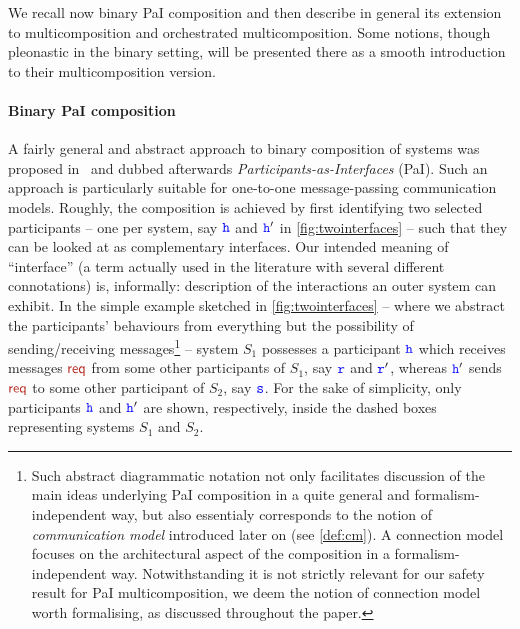 We recall now binary PaI composition and then describe in general its extension to multicomposition
and orchestrated multicomposition. Some notions, though pleonastic in the binary setting,
will be presented there as a smooth introduction to their multicomposition version.
 

\noindent
\paragraph{ Binary PaI composition}
A fairly general and abstract approach to binary composition of systems 
was proposed in~\cite{BdLH19} and dubbed afterwards {\em Participants-as-Interfaces} (PaI).
 Such an approach is particularly suitable for one-to-one message-passing communication models.
Roughly, the composition is achieved by first identifying two selected participants  -- one per system,
say ${\mathtt{\color{blue}{ {h}}}}$ and ${\mathtt{\color{blue}{ {h}}}}'$ in \cref{fig:twointerfaces} -- such that they can be looked at as
complementary interfaces. Our intended meaning of ``interface'' (a term actually used in the literature with  several different connotations) is, informally: description of the interactions an outer system can
exhibit.  %
In the simple example sketched in \cref{fig:twointerfaces}
--  where we abstract the participants' behaviours from everything but the possibility of 
 sending/receiving messages\footnote{Such abstract diagrammatic notation not only facilitates  
 discussion of the main ideas underlying PaI composition in a quite general  and formalism-independent way, 
 but also essentialy corresponds to the notion of {\em communication model} introduced later on (see \cref{def:cm}).
  A connection model focuses on the architectural aspect of the composition in a formalism-independent way. 
 Notwithstanding it is not strictly relevant for our safety result for 
 PaI multicomposition,  we deem the notion of connection model worth formalising, as discussed throughout the paper. 
 }  -- system $S_1$ possesses a participant 
 ${\mathtt{\color{blue}{ {h}}}}$ which receives messages $\msg[req]$ from some other participants of $S_1$, say ${\mathtt{\color{blue}{ {r}}}}$ and ${\mathtt{\color{blue}{ {r}}}}'$, whereas ${\mathtt{\color{blue}{ {h}}}}'$ sends $\msg[req]$ to some other participant of $S_2$, say ${\mathtt{\color{blue}{ {s}}}}$. 
For the sake of simplicity, only participants ${\mathtt{\color{blue}{ {h}}}}$ and ${\mathtt{\color{blue}{ {h}}}}'$ are shown, respectively, inside the dashed boxes representing systems  $S_1$ and $S_2$.

